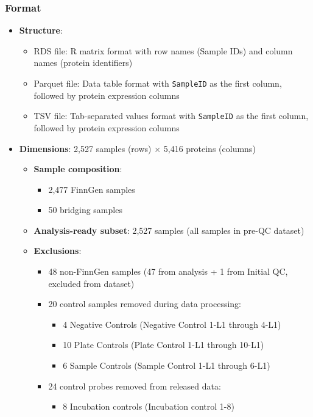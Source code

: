 \documentclass[11pt,a4paper]{article}
\begin{document}
\subsubsection{Format}
\begin{itemize}
\item \textbf{Structure}:
  \begin{itemize}
    \item RDS file: R matrix format with row names (Sample IDs) and column names (protein identifiers)
    \item Parquet file: Data table format with \texttt{SampleID} as the first column, followed by protein expression columns
    \item TSV file: Tab-separated values format with \texttt{SampleID} as the first column, followed by protein expression columns
  \end{itemize}
\item \textbf{Dimensions}: 2,527 samples (rows) $\times$ 5,416 proteins (columns)
  \begin{itemize}
    \item \textbf{Sample composition}:
      \begin{itemize}
        \item 2,477 FinnGen samples
        \item 50 bridging samples
      \end{itemize}
    \item \textbf{Analysis-ready subset}: 2,527 samples (all samples in pre-QC dataset)
    \item \textbf{Exclusions}:
      \begin{itemize}
        \item 48 non-FinnGen samples (47 from analysis + 1 from Initial QC, excluded from dataset)
        \item 20 control samples removed during data processing:
          \begin{itemize}
            \item 4 Negative Controls (Negative Control 1-L1 through 4-L1)
            \item 10 Plate Controls (Plate Control 1-L1 through 10-L1)
            \item 6 Sample Controls (Sample Control 1-L1 through 6-L1)
          \end{itemize}
        \item 24 control probes removed from released data:
          \begin{itemize}
            \item 8 Incubation controls (Incubation control 1-8)

\end{itemize}
\end{itemize}
\end{itemize}
\end{itemize}
\end{document}
